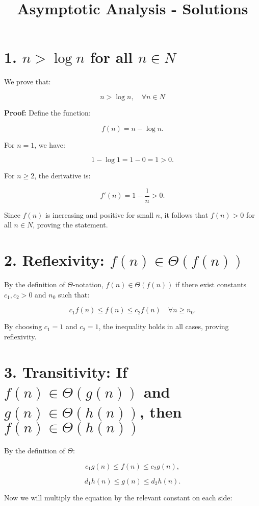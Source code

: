 \documentclass{article}
\begin{document}
\title{Asymptotic Analysis - Solutions}
\author{}
\date{}
\maketitle

\section*{1. \( n > \log n \) for all \( n \in N \) }

We prove that:

\[
n > \log n, \quad \forall n \in N
\]

\textbf{Proof:} Define the function:

\[
f(n) = n - \log n.
\]

For \( n = 1 \), we have:

\[
1 - \log 1 = 1 - 0 = 1 > 0.
\]

For \( n \geq 2 \), the derivative is:

\[
f'(n) = 1 - \frac{1}{n} > 0.
\]

Since \( f(n) \) is increasing and positive for small \( n \), it follows that \( f(n) > 0 \) for all \( n \in N \), proving the statement. 

\section*{2. Reflexivity: \( f(n) \in \Theta(f(n)) \) }

By the definition of \(\Theta\)-notation, \( f(n) \in \Theta(f(n)) \) if there exist constants \( c_1, c_2 > 0 \) and \( n_0 \) such that:

\[
c_1 f(n) \leq f(n) \leq c_2 f(n) \quad \forall n \geq n_0.
\]

By choosing \( c_1 = 1 \) and \( c_2 = 1 \), the inequality holds in all cases, proving reflexivity.

\section*{3. Transitivity: If \( f(n) \in \Theta(g(n)) \) and \( g(n) \in \Theta(h(n)) \), then \( f(n) \in \Theta(h(n)) \)}

By the definition of $\Theta$:

\[
c_1 g(n) \leq f(n) \leq c_2 g(n),
\]

\[
d_1 h(n) \leq g(n) \leq d_2 h(n).
\]

Now we will multiply the equation by the relevant constant on each side:
\end{document}

